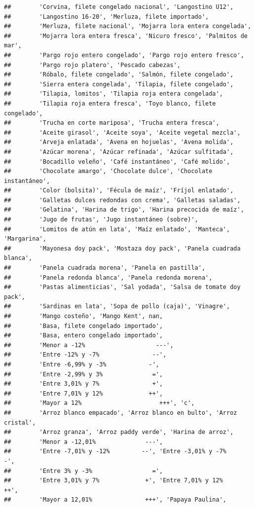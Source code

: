 \documentclass[
]{book}
\begin{document}
\begin{verbatim}
##        'Corvina, filete congelado nacional', 'Langostino U12',
##        'Langostino 16-20', 'Merluza, filete importado',
##        'Merluza, filete nacional', 'Mojarra lora entera congelada',
##        'Mojarra lora entera fresca', 'Nicuro fresco', 'Palmitos de mar',
##        'Pargo rojo entero congelado', 'Pargo rojo entero fresco',
##        'Pargo rojo platero', 'Pescado cabezas',
##        'Róbalo, filete congelado', 'Salmón, filete congelado',
##        'Sierra entera congelada', 'Tilapia, filete congelado',
##        'Tilapia, lomitos', 'Tilapia roja entera congelada',
##        'Tilapia roja entera fresca', 'Toyo blanco, filete congelado',
##        'Trucha en corte mariposa', 'Trucha entera fresca',
##        'Aceite girasol', 'Aceite soya', 'Aceite vegetal mezcla',
##        'Arveja enlatada', 'Avena en hojuelas', 'Avena molida',
##        'Azúcar morena', 'Azúcar refinada', 'Azúcar sulfitada',
##        'Bocadillo veleño', 'Café instantáneo', 'Café molido',
##        'Chocolate amargo', 'Chocolate dulce', 'Chocolate instantáneo',
##        'Color (bolsita)', 'Fécula de maíz', 'Fríjol enlatado',
##        'Galletas dulces redondas con crema', 'Galletas saladas',
##        'Gelatina', 'Harina de trigo', 'Harina precocida de maíz',
##        'Jugo de frutas', 'Jugo instantáneo (sobre)',
##        'Lomitos de atún en lata', 'Maíz enlatado', 'Manteca', 'Margarina',
##        'Mayonesa doy pack', 'Mostaza doy pack', 'Panela cuadrada blanca',
##        'Panela cuadrada morena', 'Panela en pastilla',
##        'Panela redonda blanca', 'Panela redonda morena',
##        'Pastas alimenticias', 'Sal yodada', 'Salsa de tomate doy pack',
##        'Sardinas en lata', 'Sopa de pollo (caja)', 'Vinagre',
##        'Mango costeño', 'Mango Kent', nan,
##        'Basa, filete congelado importado',
##        'Basa, entero congelado importado',
##        'Menor a -12%                    ---',
##        'Entre -12% y -7%               --',
##        'Entre -6,99% y -3%            -',
##        'Entre -2,99% y 3%              =',
##        'Entre 3,01% y 7%               +',
##        'Entre 7,01% y 12%             ++',
##        'Mayor a 12%                      +++', 'c',
##        'Arroz blanco empacado', 'Arroz blanco en bulto', 'Arroz cristal',
##        'Arroz granza', 'Arroz paddy verde', 'Harina de arroz',
##        'Menor a -12,01%              ---',
##        'Entre -7,01% y -12%         --', 'Entre -3,01% y -7%           -',
##        'Entre 3% y -3%                 =',
##        'Entre 3,01% y 7%             +', 'Entre 7,01% y 12%           ++',
##        'Mayor a 12,01%               +++', 'Papaya Paulina',

\end{verbatim}
\end{document}
